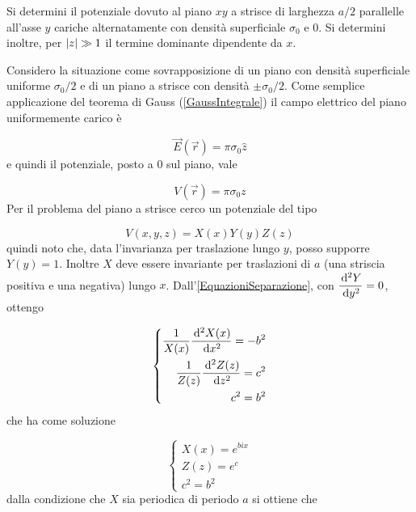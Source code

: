 \documentclass[../main.tex]{subfiles}
\begin{document}

\textex

Si determini il potenziale dovuto al piano $xy$ a strisce di larghezza $a/2$ parallelle all'asse $y$ cariche alternatamente con densità superficiale $\sigma_0$  e $0$.\newline
Si determini inoltre, per $\lvert z\rvert \gg 1$ il termine dominante dipendente da $x$.

\solution
Considero la situazione come sovrapposizione di un piano con densità superficiale uniforme $\sigma_0/2$ e di un piano a strisce con densità $\pm \sigma_0/2$.
Come semplice applicazione del teorema di Gauss (\cref{GaussIntegrale}) il campo elettrico del piano uniformemente carico è

\begin{equation*}
  \vec E (\vec r)= \pi \sigma_0 \hat z 
\end{equation*}
e quindi il potenziale, posto a $0$ sul piano, vale

\begin{equation}
  \label{pz:potenzialeuniforme}
  V(\vec r)= \pi \sigma_0 z
\end{equation}
Per il problema del piano a strisce cerco un potenziale del tipo

\begin{equation}
  \label{pz:formapotenziale}
  V(x, y, z)=X(x)Y(y)Z(z)
\end{equation}
quindi noto che, data l'invarianza per traslazione lungo $y$, posso supporre $Y(y)=1$.
Inoltre $X$ deve essere invariante per traslazioni di $a$ (una striscia positiva e una negativa) lungo $x$.
Dall'\cref{EquazioniSeparazione}, con $\displaystyle\frac{\,\mathrm d^2Y}{\,\mathrm d y^2}=0$, ottengo

\begin{equation}
  \left\{
    \begin{aligned}
      \frac{1}{X(x)}\frac{\,\mathrm d^2X(x)}{\,\mathrm d x^2}=-b^2\\
      \frac{1}{Z(z)}\frac{\,\mathrm d^2Z(z)}{\,\mathrm d z^2}=c^2\\
      c^2=b^2
    \end{aligned}
  \right.
\end{equation}
che ha come soluzione 

\begin{equation}
  \left\{
    \begin{aligned}
      X(x)=e^{bix} \\
      Z(z)=e^c \\
      c^2=b^2 
    \end{aligned}
  \right.
\end{equation}
dalla condizione che $X$ sia periodica di periodo $a$ si ottiene che
\end{document}
